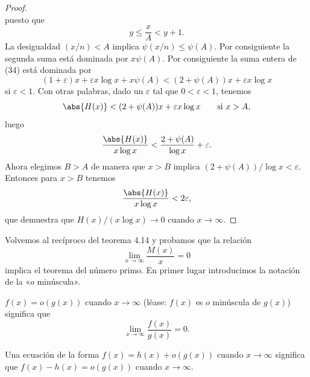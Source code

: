 \documentclass[12pt,a4paper]{book}
\begin{document}
\begin{proof}
\begin{equation*}
        \end{equation*}
        puesto que
        \begin{equation*}
            y\leq\frac{x}{A}<y+1.
        \end{equation*}
        La desigualdad $(x/n)<A$ implica $\psi(x/n)\leq\psi(A)$. Por consiguiente la
        segunda suma está dominada por $x\psi(A)$. Por consiguiente la suma entera de
        (34) está dominada por
        \begin{equation*}
            (1+\varepsilon)x+\varepsilon x\log x+x\psi(A)<(2+\psi(A))x+\varepsilon x\log x
        \end{equation*}
        si $\varepsilon<1$. Con otras palabras, dado un $\varepsilon$ tal que
        $0<\varepsilon<1$, tenemos
        \begin{equation*}
            \abs{H(x)}<(2+\psi(A))x+\varepsilon x\log x\qquad\text{si } x>A,
        \end{equation*}
        luego
        \begin{equation*}
            \frac{\abs{H(x)}}{x\log x}<\frac{2+\psi(A)}{\log x}+\varepsilon.
        \end{equation*}
        Ahora elegimos $B>A$ de manera que $x>B$ implica $(2+\psi(A))/\log x<\varepsilon$.
        Entonces para $x>B$ tenemos
        \begin{equation*}
            \frac{\abs{H(x)}}{x\log x}<2\varepsilon,
        \end{equation*}
        que demuestra que $H(x)/(x\log x)\to0$ cuando $x\to\infty$.
    \end{proof}

    Volvemos al recíproco del teorema 4.14 y probamos que la relación
    \begin{equation}
        \lim_{x\to\infty}\frac{M(x)}{x}=0
    \end{equation}
    implica el teorema del número primo. En primer lugar introducimos la
    notación de la «$o$ minúscula».

    \begin{definicion}\label{sim:o}
        $f(x)=o(g(x))$ cuando $x\to\infty$ (léase: $f(x)$ es $o$ minúscula de
        $g(x)$) significa que
        \begin{equation*}
            \lim_{x\to\infty}\frac{f(x)}{g(x)}=0.
        \end{equation*}
    \end{definicion}

    Una ecuación de la forma $f(x)=h(x)+o(g(x))$ cuando $x\to\infty$ significa que
    $f(x)-h(x)=o(g(x))$ cuando $x\to\infty$.
\end{document}
